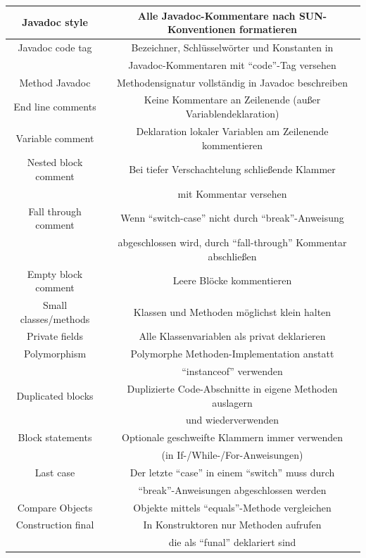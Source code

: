 \documentclass[da,ngerman]{stthesis}
\begin{document}
\begin{center}
\begin{longtabu}{|c|c|}
  						\hline
  						Javadoc style & Alle Javadoc-Kommentare nach SUN-Konventionen formatieren \\
  						\hline
  						Javadoc code tag & Bezeichner, Schlüsselwörter und Konstanten in \\ & Javadoc-Kommentaren mit "`code"'-Tag versehen \\
  						\hline 
  						Method Javadoc & Methodensignatur vollständig in Javadoc beschreiben \\
  						\hline
  						End line comments & Keine Kommentare an Zeilenende (außer Variablendeklaration) \\
  						\hline
  						Variable comment & Deklaration lokaler Variablen am Zeilenende kommentieren \\
  						\hline
  						Nested block comment & Bei tiefer Verschachtelung schließende Klammer \\ & mit Kommentar versehen \\
  						\hline
  						Fall through comment & Wenn "`switch-case"' nicht durch "`break"'-Anweisung \\ & abgeschlossen wird, durch "`fall-through"' Kommentar abschließen \\
  						\hline
  						Empty block comment & Leere Blöcke kommentieren \\
  						\hline
  						Small classes/methods & Klassen und Methoden möglichst klein halten \\
  						\hline
  						Private fields & Alle Klassenvariablen als privat deklarieren \\
  						\hline
  						Polymorphism & Polymorphe Methoden-Implementation anstatt \\ & "`instanceof"' verwenden \\
  						\hline
  						Duplicated blocks & Duplizierte Code-Abschnitte in eigene Methoden auslagern \\ & und wiederverwenden \\
  						\hline
  						Block statements & Optionale geschweifte Klammern immer verwenden \\ & (in If-/While-/For-Anweisungen) \\
  						\hline
  						Last case & Der letzte "`case"' in einem "`switch"' muss durch \\ & "`break"'-Anweisungen abgeschlossen werden \\
  						\hline
  						Compare Objects & Objekte mittels "`equals"'-Methode vergleichen \\
  						\hline
  						Construction final & In Konstruktoren nur Methoden aufrufen \\ & die als "`funal"' deklariert sind \\

\end{longtabu}
\end{center}
\end{document}
